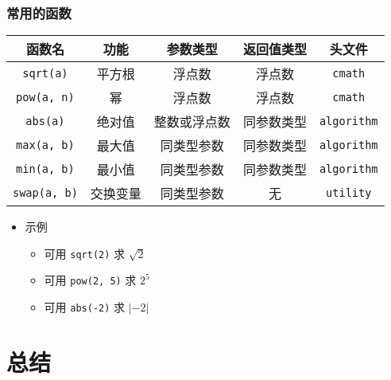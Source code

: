 \begin{frame}[fragile]
    \frametitle{常用的函数}

        \begin{tabular}{ccccc}
            \toprule
            函数名  & 功能 & 参数类型 & 返回值类型 & 头文件 \\
            \midrule
            \lstinline|sqrt(a)|  & 平方根 & 浮点数 & 浮点数 & \lstinline|cmath|  \\
            \lstinline|pow(a, n)| & 幂 & 浮点数 & 浮点数 & \lstinline|cmath|  \\
            \lstinline|abs(a)| & 绝对值 & 整数或浮点数 & 同参数类型 & \lstinline|algorithm|  \\
            \lstinline|max(a, b)| & 最大值 & 同类型参数 & 同参数类型 & \lstinline|algorithm|  \\
            \lstinline|min(a, b)| & 最小值 & 同类型参数 & 同参数类型 & \lstinline|algorithm|  \\
            \lstinline|swap(a, b)| & 交换变量 & 同类型参数 & 无 & \lstinline|utility|  \\
            \bottomrule
        \end{tabular}

        \begin{itemize}
            \item 示例
            \begin{itemize}
                \item<2-> 可用 \lstinline|sqrt(2)| 求 $\sqrt{2}$
                \item<3-> 可用 \lstinline|pow(2, 5)| 求 $2^5$
                \item<4-> 可用 \lstinline|abs(-2)| 求 $|-2|$
            \end{itemize}
        \end{itemize}
\end{frame}

\section{总结}

